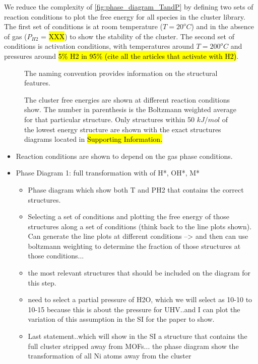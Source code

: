 \documentclass[journal=jctcce,manuscript=article]{achemso}
\begin{document}
We reduce the complexity of \ref{fig:phase_diagram_TandP} by defining two sets of reaction conditions to plot the free energy for all species in the  cluster library. The first set of conditions is at room temperature ($T = 20 ^{o}C$) and in the absence of  gas ($P_{H2}$ = \hl{XXX}) to show the stability of the cluster. The second set of conditions is activation conditions, with temperatures around $T = 200 ^{o}C$ and pressures around \hl{5\% H2 in 95\% (cite all the articles that activate with H2)}.      

\begin{figure}
    \centering
    \caption{The  cluster free energies are shown at different reaction conditions show. The number in parenthesis is the Boltzmann weighted average for that particular structure. Only structures within 50 $kJ/mol$ of the lowest energy structure are shown with the exact structures diagrams located in \hl{Supporting Information.}} The naming convention provides information on the structural features. 
    \label{fig:diff-reaction-conditons}
\end{figure}


\begin{itemize}

    \item Reaction conditions are shown to depend on the gas phase conditions. 
    \item Phase Diagram 1: full transformation with of H*, OH*, M* 
    \begin{itemize}
        \item Phase diagram which show both T and PH2 that contains the correct structures. 
        \item Selecting a set of conditions and plotting the free energy of those structures along a set of conditions (think back to the line plots shown). Can generate the line plots at different conditions --> and then can use boltzmann weighting to determine the fraction of those structures at those conditions... 
        \item the most relevant structures that should be included on the diagram for this step. 
        \item need to select a partial pressure of H2O, which we will select as 10-10 to 10-15 because this is about the pressure for UHV..and I can plot the variation of this assumption in the SI for the paper to show. 
        \item Last statement..which will show in the SI a structure that contains the full cluster stripped away from MOFs... the phase diagram show the transformation of all Ni atoms away from the cluster
    \end{itemize}
\end{itemize}
\end{document}
